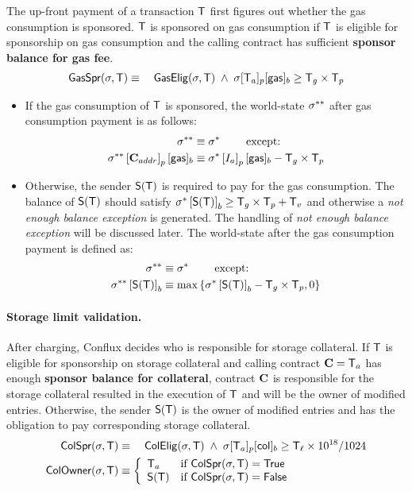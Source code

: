 The up-front payment of a transaction $\textsf{T}$ first figures out whether the gas consumption is sponsored. $\textsf{T}$ is sponsored on gas consumption if $\textsf{T}$ is eligible for sponsorship on gas consumption and the calling contract has sufficient \textbf{sponsor balance for gas fee}. 
\begin{align}
	\mathsf{GasSpr}(\mathbf{\sigma},\textsf{T}) \equiv\quad  \mathsf{GasElig}(\mathbf{\sigma},\textsf{T}) \;\wedge\; \mathbf{\sigma}[\textsf{T}_a]_p[{\sf gas}]_b\ge \textsf{T}_g\times\textsf{T}_p
\end{align}
\begin{itemize}
	\item If the gas consumption of $\textsf{T}$ is sponsored, the world-state $\mathbf{\sigma}^{**}$ after gas consumption payment is as follows: 
	\begin{align}
		\mathbf{\sigma}^{**}  &\equiv \mathbf{\sigma}^* \qquad \mbox{  except:}\\
		\mathbf{\sigma}^{**}\left[\mathbf{C}_{addr}\right]_p[{\sf gas}]_b &\equiv \mathbf{\sigma}^*\left[I_a\right]_p[{\sf gas}]_b-\textsf{T}_g\times\textsf{T}_p
	\end{align} 
	
	\item Otherwise, the sender $\mathsf{S}{\left({\textsf{T}} \right)}$ is required to pay for the gas consumption. 
	The balance of $\mathsf{S}{\left({\textsf{T}} \right)}$ should satisfy $\mathbf{\sigma}^{*} \left[\mathsf{S}{\left({\textsf{T}} \right)}\right]_b \ge \textsf{T}_g\times\textsf{T}_p+\textsf{T}_v$ and otherwise a \emph{not enough balance exception} is generated. The handling of \emph{not enough balance exception} will be discussed later.
	The world-state after the gas consumption payment is defined as: 
	\begin{align}
		\mathbf{\sigma}^{**}  &\equiv \mathbf{\sigma}^* \qquad \mbox{  except:}\\
		\mathbf{\sigma}^{**} \left[\mathsf{S}{\left({\textsf{T}} \right)}\right]_b &\equiv \max{\left \{{\ensuremath{\mathbf{\sigma}}^*\left[\ensuremath{\mathsf{S}{\left({\textsf{T}} \right)}}\right]_b-\textsf{T}_g\times\textsf{T}_p,0} \right \}}
	\end{align}
\end{itemize}

\paragraph{Storage limit validation.}

After charging, Conflux decides who is responsible for storage collateral. If $\textsf{T}$ is eligible for sponsorship on storage collateral and calling contract $\mathbf{C}=\textsf{T}_a$ has enough \textbf{sponsor balance for collateral}, contract $\mathbf{C}$ is responsible for the storage collateral resulted in the execution of $\textsf{T}$ and will be the owner of modified entries. 
%
Otherwise, the sender $\mathsf{S}{\left({\textsf{T}} \right)}$ is the owner of modified entries
and has the obligation to pay corresponding storage collateral. 
%
\begin{align}
	\mathsf{ColSpr}(\mathbf{\sigma},\textsf{T}) &\equiv\quad  \mathsf{ColElig}(\mathbf{\sigma},\textsf{T}) \;\wedge\; \mathbf{\sigma}[\textsf{T}_a]_p[{\sf col}]_b\ge \textsf{T}_\ell\times 10^{18}/1024 \\
	\mathsf{ColOwner}(\mathbf{\sigma},\textsf{T}) &\equiv\left\{ \begin{array}{ll}
		\textsf{T}_a & \text{if } \mathsf{ColSpr}(\mathbf{\sigma},\textsf{T}) = \mathsf{True} \\ 
		\mathsf{S}{\left({\textsf{T}} \right)} & \text{if } \mathsf{ColSpr}(\mathbf{\sigma},\textsf{T}) = \mathsf{False} \\ 
	\end{array}\right.
\end{align}

